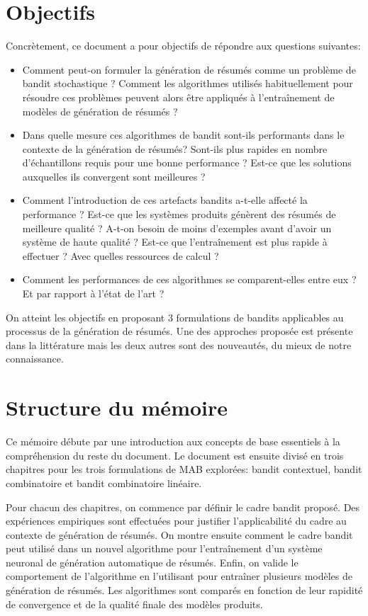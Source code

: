 \section*{Objectifs}

Concrètement, ce document a pour objectifs de répondre aux questions suivantes:

\begin{itemize}
      \item Comment peut-on formuler la génération de résumés comme un problème de bandit stochastique ?
            Comment les algorithmes utilisés habituellement pour résoudre ces problèmes peuvent
            alors être appliqués à l'entraînement de modèles de génération de résumés ?
      \item Dans quelle mesure ces algorithmes de bandit sont-ils performants dans le contexte de 
            la génération de résumés?
            Sont-ils plus rapides en nombre d'échantillons requis pour une
            bonne performance ? Est-ce que les solutions auxquelles ils convergent sont meilleures ?
      \item Comment l'introduction de ces artefacts bandits a-t-elle affecté la performance ?
            Est-ce que les systèmes produits génèrent des résumés de meilleure qualité ?
            A-t-on besoin de moins d'exemples avant d'avoir un système de haute qualité ?
            Est-ce que l'entraînement est plus rapide à effectuer ? Avec quelles ressources de calcul ?
      \item Comment les performances de ces algorithmes se comparent-elles entre eux ? Et par rapport à l'état de l'art ?
\end{itemize}

On atteint les objectifs en proposant 3 formulations de bandits applicables au processus
de la génération de résumés.
Une des approches proposée est présente dans la littérature mais les deux autres sont
des nouveautés, du mieux de notre connaissance.

\section*{Structure du mémoire}

Ce mémoire débute par une introduction aux concepts de base essentiels à la compréhension
du reste du document.
Le document est ensuite divisé en trois chapitres pour les trois formulations de MAB explorées:
bandit contextuel, bandit combinatoire et bandit combinatoire linéaire.

Pour chacun des chapitres, on commence par définir le cadre bandit proposé.
Des expériences empiriques sont effectuées pour justifier l'applicabilité
du cadre au contexte de génération de résumés.
On montre ensuite comment le cadre bandit peut utilisé dans un nouvel algorithme
pour l'entraînement d'un système neuronal de génération automatique de résumés.
Enfin, on valide le comportement de l'algorithme en l'utilisant pour
entraîner plusieurs modèles de génération de résumés.
Les algorithmes sont comparés en fonction de leur rapidité de convergence et
de la qualité finale des modèles produits.
